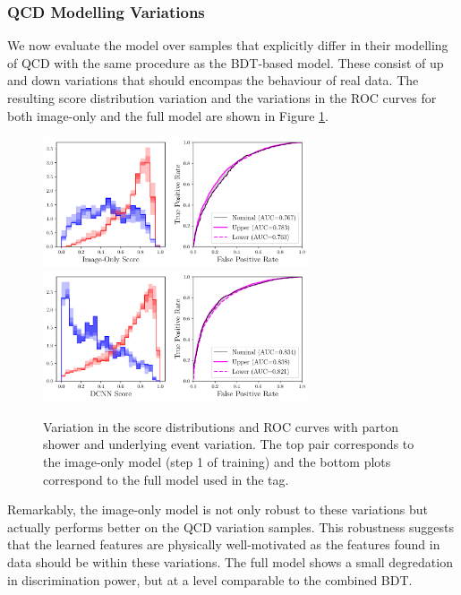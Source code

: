\subsubsection{QCD Modelling Variations}
We now evaluate the model over samples that explicitly differ in their modelling of QCD with the same procedure as the BDT-based model.
These consist of up and down variations that should encompas the behaviour of real data.
The resulting score distribution variation and the variations in the ROC curves for both image-only and the full model are shown in Figure \ref{fig:event_categorisation:DCNN_psvar}.
\begin{figure}[h!]
    \includegraphics[width=0.7\textwidth]{figures/event_selection/imgonly_PSvar_PS.pdf}
    \includegraphics[width=0.7\textwidth]{figures/event_selection/int_PSvar_PS.pdf}
    \caption{Variation in the score distributions and ROC curves with parton shower and underlying event variation. The top pair corresponds to the image-only model (step 1 of training) and the bottom plots correspond to the full model used in the tag. }
    \label{fig:event_categorisation:DCNN_psvar}
\end{figure}

Remarkably, the image-only model is not only robust to these variations but actually performs better on the QCD variation samples.
This robustness suggests that the learned features are physically well-motivated as the features found in data should be within these variations.
The full model shows a small degredation in discrimination power, but at a level comparable to the combined BDT. 

